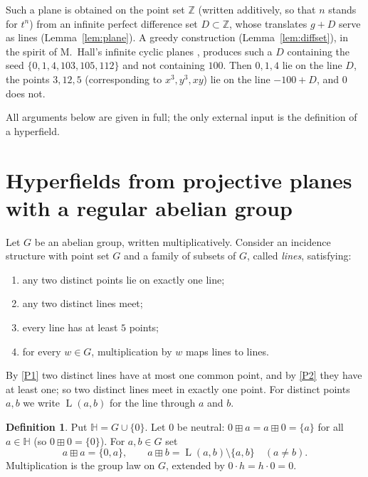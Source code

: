 \documentclass[11pt]{article}
\theoremstyle{definition}
\newtheorem{definition}[theorem]{Definition}
\theoremstyle{remark}
\newcommand{\HH}{\mathbb{H}}
\newcommand{\Z}{\mathbb{Z}}
\newcommand{\bp}{\boxplus}
\DeclareMathOperator{\Ln}{L}
\begin{document}
Such a plane is obtained on the point set $\Z$ (written additively, so that $n$ stands for $t^n$) from an infinite perfect difference set $D\subset\Z$, whose translates $g+D$ serve as lines (Lemma~\ref{lem:plane}). A greedy construction (Lemma~\ref{lem:diffset}), in the spirit of M.~Hall's infinite cyclic planes \cite{Hall}, produces such a $D$ containing the seed $\{0,1,4,103,105,112\}$ and not containing $100$. Then $0,1,4$ lie on the line $D$, the points $3,12,5$ (corresponding to $x^3,y^3,xy$) lie on the line $-100+D$, and $0$ does not.

All arguments below are given in full; the only external input is the definition of a hyperfield.

\section{Hyperfields from projective planes with a regular abelian group}\label{sec:planes}

Let $G$ be an abelian group, written multiplicatively. Consider an incidence structure with point set $G$ and a family of subsets of $G$, called \emph{lines}, satisfying:
\begin{enumerate}[label=\textup{(P\arabic*)},nosep]
\item\label{P1} any two distinct points lie on exactly one line;
\item\label{P2} any two distinct lines meet;
\item\label{P3} every line has at least $5$ points;
\item\label{P4} for every $w\in G$, multiplication by $w$ maps lines to lines.
\end{enumerate}
By \ref{P1} two distinct lines have at most one common point, and by \ref{P2} they have at least one; so two distinct lines meet in exactly one point. For distinct points $a,b$ we write $\Ln(a,b)$ for the line through $a$ and $b$.

\begin{definition}\label{def:H}
Put $\HH=G\cup\{0\}$. Let $0$ be neutral: $0\bp a=a\bp 0=\{a\}$ for all $a\in\HH$ (so $0\bp0=\{0\}$). For $a,b\in G$ set
\[
a\bp a=\{0,a\},\qquad a\bp b=\Ln(a,b)\setminus\{a,b\}\quad(a\neq b).
\]
Multiplication is the group law on $G$, extended by $0\cdot h=h\cdot 0=0$.
\end{definition}
\end{document}
